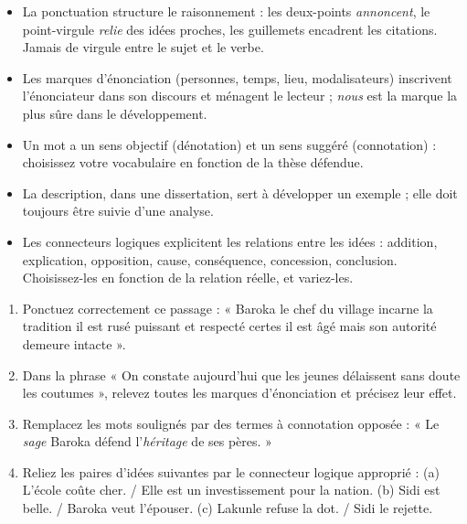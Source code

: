 \documentclass[11pt]{article}
\begin{document}
\begin{aretenir}
\begin{itemize}
\item La ponctuation structure le raisonnement : les deux-points \emph{annoncent}, le point-virgule \emph{relie} des idées proches, les guillemets encadrent les citations. Jamais de virgule entre le sujet et le verbe.
\item Les marques d'énonciation (personnes, temps, lieu, modalisateurs) inscrivent l'énonciateur dans son discours et ménagent le lecteur ; \emph{nous} est la marque la plus sûre dans le développement.
\item Un mot a un sens objectif (dénotation) et un sens suggéré (connotation) : choisissez votre vocabulaire en fonction de la thèse défendue.
\item La description, dans une dissertation, sert à développer un exemple ; elle doit toujours être suivie d'une analyse.
\item Les connecteurs logiques explicite­nt les relations entre les idées : addition, explication, opposition, cause, conséquence, concession, conclusion. Choisissez-les en fonction de la relation réelle, et variez-les.
\end{itemize}
\end{aretenir}

\begin{exercice}
\begin{enumerate}
\item Ponctuez correctement ce passage : « Baroka le chef du village incarne la tradition il est rusé puissant et respecté certes il est âgé mais son autorité demeure intacte ».
\item Dans la phrase « On constate aujourd'hui que les jeunes délaissent sans doute les coutumes », relevez toutes les marques d'énonciation et précisez leur effet.
\item Remplacez les mots soulignés par des termes à connotation opposée : « Le \emph{sage} Baroka défend l'\emph{héritage} de ses pères. »
\item Reliez les paires d'idées suivantes par le connecteur logique approprié : (a) L'école coûte cher. / Elle est un investissement pour la nation. (b) Sidi est belle. / Baroka veut l'épouser. (c) Lakunle refuse la dot. / Sidi le rejette.
\end{enumerate}
\end{exercice}
\end{document}
